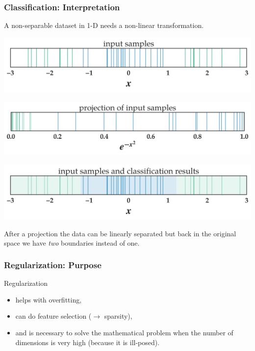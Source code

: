 \documentclass[11pt]{beamer}
\begin{document}
\begin{frame}
  \frametitle{Classification: Interpretation}
  A non-separable dataset in 1-D needs a non-linear transformation. 
  \begin{center}
    \includegraphics[scale=0.3]{figures/input_features.png}
  \end{center}
  \begin{center}
    \includegraphics[scale=0.3]{figures/projection.png}
  \end{center}
  \begin{center}
    \includegraphics[scale=0.3]{figures/prediction.png}
  \end{center}
  After a projection the data can be linearly separated but back in the original space we have
  \emph{two} boundaries instead of one.
\end{frame}
\begin{frame}
  \frametitle{Regularization: Purpose}
  Regularization
  \begin{itemize}
  \item helps with overfitting,
  \item can do feature selection ($\rightarrow$ sparsity),
  \item and is necessary to solve the mathematical problem when the number of
    dimensions is very high (because it is ill-posed).
  \end{itemize}

\end{frame}
\end{document}
